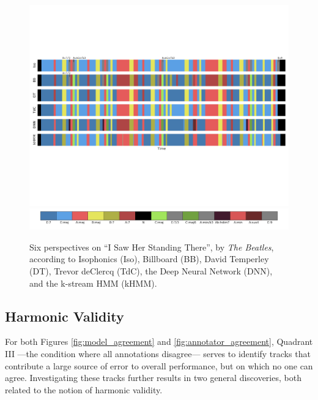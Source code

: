 \documentclass{article}
\begin{document}
\begin{figure}[t!]
\centering
\includegraphics[width=\textwidth]{TROSSUK149E3AE03BD_annotations_mkup2}
\includegraphics[width=\textwidth]{TROSSUK149E3AE03BD_legend}
\caption{Six perspectives on ``I Saw Her Standing There'', by \emph{The Beatles}, according to Isophonics (Iso), Billboard (BB), David Temperley (DT), Trevor deClercq (TdC), the Deep Neural Network (DNN), and the k-stream HMM (kHMM).}
\label{fig:beatles}
\end{figure}



\subsection{Harmonic Validity}
\label{subsec:validity}

For both Figures \ref{fig:model_agreement} and \ref{fig:annotator_agreement}, Quadrant III ---the condition where all annotations disagree--- serves to identify tracks that contribute a large source of error to overall performance, but on which no one can agree.
Investigating these tracks further results in two general discoveries, both related to the notion of harmonic validity.

\end{document}
